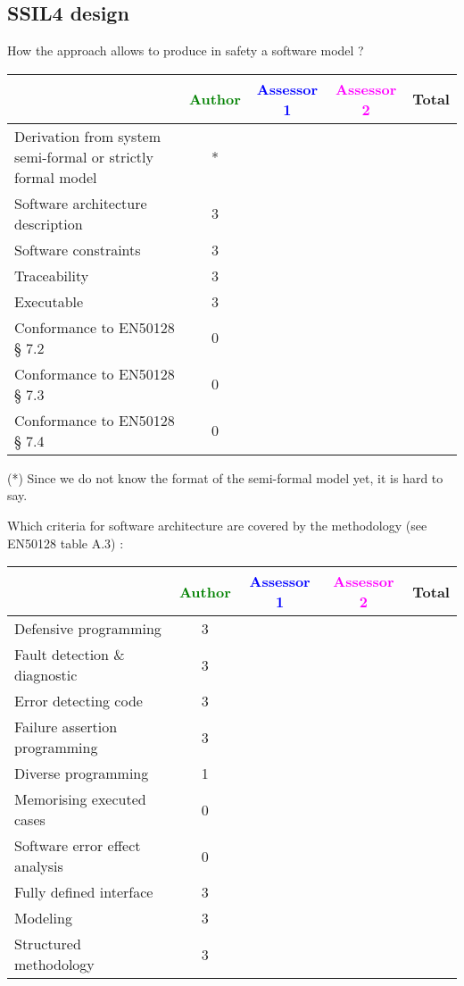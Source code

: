 \subsection{SSIL4 design}

How the approach allows to  produce in safety a software model ?

\begin{tabular}{|l | c | c | c | c|}
\hline
& \textcolor{green}{Author} & \textcolor{blue}{Assessor 1} & \textcolor{magenta}{Assessor 2} & Total \\
\hline
Derivation from system semi-formal or strictly formal model  &* & & &  \\
\hline 
Software architecture description  &3 & & &  \\
\hline
Software constraints  &3 & & &  \\
\hline
Traceability  &3 & & &  \\
\hline
Executable  &3 & & &  \\
\hline
Conformance to EN50128 § 7.2  &0 & & &  \\
\hline
Conformance to EN50128 § 7.3  &0 & & &  \\
\hline
Conformance to EN50128 § 7.4  &0 & & &  \\
\hline
\end{tabular}
\begin{author_comment}
(*) Since we do not know the format of the semi-formal model  yet, it is hard to say.
\end{author_comment}

Which criteria for software architecture are covered by the methodology
(see EN50128 table A.3) :

\begin{tabular}{|l | c | c | c | c|}
\hline
& \textcolor{green}{Author} & \textcolor{blue}{Assessor 1} & \textcolor{magenta}{Assessor 2} & Total \\
\hline
Defensive programming  &3 & & &  \\
\hline 
Fault detection \& diagnostic  &3 & & &  \\
\hline
Error detecting code  &3 & & &  \\
\hline
Failure assertion programming &3 & & &  \\
\hline
Diverse programming &1 & & &  \\
\hline
Memorising executed cases &0 & & &  \\
\hline
Software error effect analysis &0 & & &  \\
\hline
Fully defined interface &3 & & &  \\
\hline
Modeling  &3 & & &  \\
\hline
Structured methodology &3 & & &  \\
\hline
\end{tabular}

